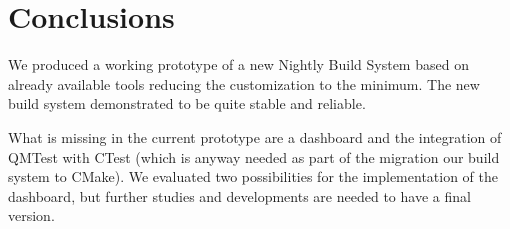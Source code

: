 \section{Conclusions}
\label{sec:Conclusion}
We produced a working prototype of a new Nightly Build System based on already
available tools reducing the customization to the minimum.  The new build system
demonstrated to be quite stable and reliable.

What is missing in the current prototype are a dashboard and the integration of
QMTest with CTest (which is anyway needed as part of the migration our build
system to CMake).  We evaluated two possibilities for the implementation of the
dashboard, but further studies and developments are needed to have a final
version.
